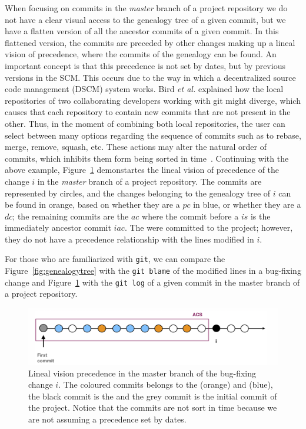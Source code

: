 \documentclass[a4paper, 12pt]{book}
\begin{document}
When focusing on commits in the \emph{master} branch of a project repository we do not have a clear visual access to the genealogy tree of a given commit, but we have a flatten version of all the ancestor commits of a given commit. In this flattened version, the commits are preceded by other changes making up a lineal vision of precedence, where the commits of the genealogy can be found. An important concept is that this precedence is not set by dates, but by previous versions in the SCM. This occurs due to the way in which a decentralized source code management (DSCM) system works. Bird \emph{et al.} explained how the local repositories of two collaborating developers working with git might diverge, which causes that each repository to contain new commits that are not present in the other. Thus, in the moment of combining both local repositories, the user can select between many options regarding the sequence of commits such as to rebase, merge, remove, squash, etc. These actions may alter the natural order of commits, which inhibits them form being sorted in time~\cite{bird2009promises}. Continuing with the above example, Figure~\ref{fig:precedence} demonstartes the lineal vision of precedence of the change $i$ in the \emph{master} branch of a project repository. The commits are represented by circles, and the changes belonging to the genealogy tree of $i$ can be found in orange, based on whether they are a $pc$ in blue, or whether they are a $dc$; the remaining commits are the $ac$ where the commit before a $is$ is the immediately ancestor commit $iac$. The  were committed to the project; however, they do not have a precedence relationship with the lines modified in $i$.    

For those who are familiarized with \texttt{git}, we can compare the Figure~\ref{fig:genealogytree} with the \texttt{git blame} of the modified lines in a bug-fixing change and Figure~\ref{fig:precedence} with the \texttt{git log} of a given commit in the master branch of a project repository. 

\begin{figure}[ht]
\centering
\includegraphics[width=\columnwidth]{img/visionlog.png}
\caption{Lineal vision precedence in the master branch of the bug-fixing change $i$. The coloured commits belongs to the  (orange) and  (blue), the black commit is the \BFC and the grey commit is the initial commit of the project. Notice that the commits are not sort in time because we are not assuming a precedence set by dates.}
\label{fig:precedence}       %
\end{figure}
\end{document}
